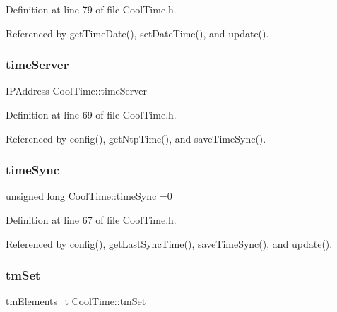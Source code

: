 Definition at line 79 of file Cool\+Time.\+h.



Referenced by get\+Time\+Date(), set\+Date\+Time(), and update().

\mbox{\label{classCoolTime_ad2b9858f399108cb440dd1e908916f04}} 
\subsubsection{\texorpdfstring{time\+Server}{timeServer}}
{\footnotesize\ttfamily I\+P\+Address Cool\+Time\+::time\+Server\hspace{0.3cm}{\ttfamily [private]}}



Definition at line 69 of file Cool\+Time.\+h.



Referenced by config(), get\+Ntp\+Time(), and save\+Time\+Sync().

\mbox{\label{classCoolTime_a9d032e76c3470a15b3bbbc52af6463f7}} 
\subsubsection{\texorpdfstring{time\+Sync}{timeSync}}
{\footnotesize\ttfamily unsigned long Cool\+Time\+::time\+Sync =0\hspace{0.3cm}{\ttfamily [private]}}



Definition at line 67 of file Cool\+Time.\+h.



Referenced by config(), get\+Last\+Sync\+Time(), save\+Time\+Sync(), and update().

\mbox{\label{classCoolTime_ad33c2713c903ff064ad09c46406ae088}} 
\subsubsection{\texorpdfstring{tm\+Set}{tmSet}}
{\footnotesize\ttfamily tm\+Elements\+\_\+t Cool\+Time\+::tm\+Set\hspace{0.3cm}{\ttfamily [private]}}



